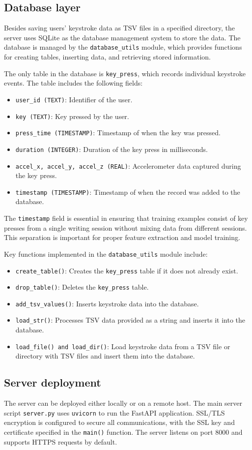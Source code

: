 \subsection{Database layer}
Besides saving users' keystroke data as TSV files in a specified directory, the server uses SQLite as the database management system to store the data. The database is managed by the \texttt{database\_utils} module, which provides functions for creating tables, inserting data, and retrieving stored information.

The only table in the database is \texttt{key\_press}, which records individual keystroke events. The table includes the following fields:
\begin{itemize}
    \item \texttt{user\_id (TEXT)}: Identifier of the user.
    \item \texttt{key (TEXT)}: Key pressed by the user.
    \item \texttt{press\_time (TIMESTAMP)}: Timestamp of when the key was pressed.
    \item \texttt{duration (INTEGER)}: Duration of the key press in milliseconds.
    \item \texttt{accel\_x, accel\_y, accel\_z (REAL)}: Accelerometer data captured during the key press.
    \item \texttt{timestamp (TIMESTAMP)}: Timestamp of when the record was added to the database.
\end{itemize}
The \texttt{timestamp} field is essential in ensuring that training examples consist of key presses from a single writing session without mixing data from different sessions. This separation is important for proper feature extraction and model training.

Key functions implemented in the \texttt{database\_utils} module include:
\begin{itemize}
    \item \texttt{create\_table()}: Creates the \texttt{key\_press} table if it does not already exist.
    \item \texttt{drop\_table()}: Deletes the \texttt{key\_press} table.
    \item \texttt{add\_tsv\_values()}: Inserts keystroke data into the database.
    \item \texttt{load\_str()}: Processes TSV data provided as a string and inserts it into the database.
    \item \texttt{load\_file() and load\_dir()}: Load keystroke data from a TSV file or directory with TSV files and insert them into the database.
\end{itemize}

\subsection{Server deployment}
The server can be deployed either locally or on a remote host. The main server script \texttt{server.py} uses \texttt{uvicorn} to run the FastAPI application. SSL/TLS encryption is configured to secure all communications, with the SSL key and certificate specified in the \texttt{main()} function. The server listens on port 8000 and supports HTTPS requests by default.